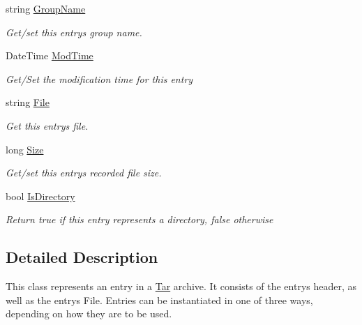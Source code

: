\begin{DoxyCompactItemize}
string \hyperlink{class_i_c_sharp_code_1_1_sharp_zip_lib_1_1_tar_1_1_tar_entry_ae15164a7a056c3367335c031f63c2ec5}{Group\+Name}
\begin{DoxyCompactList}\small\item\em Get/set this entry\textquotesingle{}s group name. \end{DoxyCompactList}\item 
Date\+Time \hyperlink{class_i_c_sharp_code_1_1_sharp_zip_lib_1_1_tar_1_1_tar_entry_abc88c1607d0890fa43916144141cad9c}{Mod\+Time}
\begin{DoxyCompactList}\small\item\em Get/\+Set the modification time for this entry \end{DoxyCompactList}\item 
string \hyperlink{class_i_c_sharp_code_1_1_sharp_zip_lib_1_1_tar_1_1_tar_entry_a56580c33a0742801cd819512f217a428}{File}
\begin{DoxyCompactList}\small\item\em Get this entry\textquotesingle{}s file. \end{DoxyCompactList}\item 
long \hyperlink{class_i_c_sharp_code_1_1_sharp_zip_lib_1_1_tar_1_1_tar_entry_ad8eb54712409ac0e82eacb34dad2541e}{Size}
\begin{DoxyCompactList}\small\item\em Get/set this entry\textquotesingle{}s recorded file size. \end{DoxyCompactList}\item 
bool \hyperlink{class_i_c_sharp_code_1_1_sharp_zip_lib_1_1_tar_1_1_tar_entry_a01c6d7b665c277dcfdcd84b98bf0e0d2}{Is\+Directory}
\begin{DoxyCompactList}\small\item\em Return true if this entry represents a directory, false otherwise \end{DoxyCompactList}\end{DoxyCompactItemize}


\subsection{Detailed Description}
This class represents an entry in a \hyperlink{namespace_i_c_sharp_code_1_1_sharp_zip_lib_1_1_tar}{Tar} archive. It consists of the entry\textquotesingle{}s header, as well as the entry\textquotesingle{}s File. Entries can be instantiated in one of three ways, depending on how they are to be used. 


